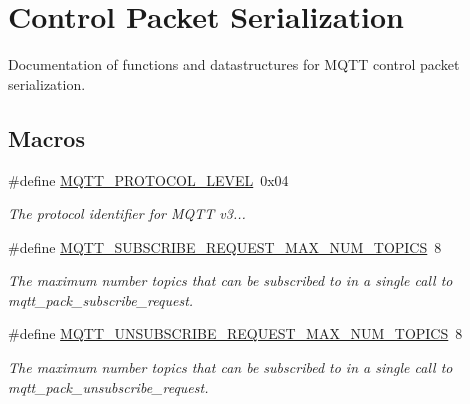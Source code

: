 \hypertarget{group__packers}{}\section{Control Packet Serialization}
\label{group__packers}


Documentation of functions and datastructures for M\+Q\+TT control packet serialization.  


\subsection*{Macros}
\begin{DoxyCompactItemize}
\item 
\#define \hyperlink{group__packers_ga50781ed232e8fd19a071d07566579974}{M\+Q\+T\+T\+\_\+\+P\+R\+O\+T\+O\+C\+O\+L\+\_\+\+L\+E\+V\+EL}~0x04
\begin{DoxyCompactList}\small\item\em The protocol identifier for M\+Q\+TT v3... \end{DoxyCompactList}\item 
\#define \hyperlink{group__packers_ga6501874871fce6b65d972430afa64fb8}{M\+Q\+T\+T\+\_\+\+S\+U\+B\+S\+C\+R\+I\+B\+E\+\_\+\+R\+E\+Q\+U\+E\+S\+T\+\_\+\+M\+A\+X\+\_\+\+N\+U\+M\+\_\+\+T\+O\+P\+I\+CS}~8
\begin{DoxyCompactList}\small\item\em The maximum number topics that can be subscribed to in a single call to mqtt\+\_\+pack\+\_\+subscribe\+\_\+request. \end{DoxyCompactList}\item 
\#define \hyperlink{group__packers_gaff4017b7a1668b6ad6e0d006d0fdf10e}{M\+Q\+T\+T\+\_\+\+U\+N\+S\+U\+B\+S\+C\+R\+I\+B\+E\+\_\+\+R\+E\+Q\+U\+E\+S\+T\+\_\+\+M\+A\+X\+\_\+\+N\+U\+M\+\_\+\+T\+O\+P\+I\+CS}~8
\begin{DoxyCompactList}\small\item\em The maximum number topics that can be subscribed to in a single call to mqtt\+\_\+pack\+\_\+unsubscribe\+\_\+request. \end{DoxyCompactList}\end{DoxyCompactItemize}
